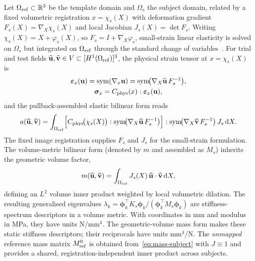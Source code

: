 \documentclass[pdflatex,sn-basic]{sn-jnl}
\begin{document}
Let $\Omega_{\rm ref}\subset\mathbb R^3$ be the template domain and $\Omega_s$ the subject domain, related by a fixed volumetric registration $x=\chi_s(X)$ with deformation gradient $F_s(X)=\nabla_X\chi_s(X)$ and local Jacobian $J_s(X)=\det F_s$.
Writing $\chi_s(X)=X+\varphi_s(X)$, so $F_s=I+\nabla_X\varphi_s$, small-strain linear elasticity is solved on $\Omega_s$ but integrated on $\Omega_{\rm ref}$ through the standard change of variables~\citep{MarsdenHughes1983,BonetWood1997}.
For trial and test fields $\widehat{\mathbf u},\widehat{\mathbf v}\in V\subset[H^1(\Omega_{\rm ref})]^3$, the physical strain tensor at $x=\chi_s(X)$ is
\begin{equation}
\begin{gathered}
\bm\varepsilon_x(\mathbf u)=\mathrm{sym}(\nabla_x \mathbf u)=\mathrm{sym}\!\big(\nabla_X \widehat{\mathbf u}\,F_s^{-1}\big),
\\
\bm\sigma_x=C_{\rm phys}(x):\bm\varepsilon_x(\mathbf u),
\end{gathered}
\end{equation}
and the pullback-assembled elastic bilinear form reads
\begin{equation}
a(\widehat{\mathbf u},\widehat{\mathbf v})
=\int_{\Omega_{\rm ref}}\!\Big[C_{\rm phys}\!\big(\chi_s(X)\big):\mathrm{sym}\!\big(\nabla_X \widehat{\mathbf u}\,F_s^{-1}\big)\Big]
:\mathrm{sym}\!\big(\nabla_X \widehat{\mathbf v}\,F_s^{-1}\big)\,J_s\,\mathrm dX.
\label{eq:pullback-bilinear}
\end{equation}
The fixed image registration supplies $F_s$ and $J_s$ for the small-strain formulation.
The volume-metric bilinear form (denoted by $m$ and assembled as $M_s$) inherits the geometric volume factor,
\begin{equation}
m(\widehat{\mathbf u},\widehat{\mathbf v})
=\int_{\Omega_{\rm ref}} J_s(X)\,\widehat{\mathbf u}\cdot\widehat{\mathbf v}\,\mathrm dX,
\label{eq:mass-subject}
\end{equation}
defining an $L^2$ volume inner product weighted by local volumetric dilation.
The resulting generalised eigenvalues $\lambda_k = \boldsymbol\phi_k^\top K_s \boldsymbol\phi_k / (\boldsymbol\phi_k^\top M_s \boldsymbol\phi_k)$ are stiffness-spectrum descriptors in a volume metric. With coordinates in mm and modulus in MPa, they have units N/mm$^4$. The geometric-volume mass form makes these static stiffness descriptors; their reciprocals have units mm$^4$/N.
The \emph{unmapped} reference mass matrix $M_{\rm ref}^{0}$ is obtained from~\eqref{eq:mass-subject} with $J\equiv 1$ and provides a shared, registration-independent inner product across subjects.
\end{document}
